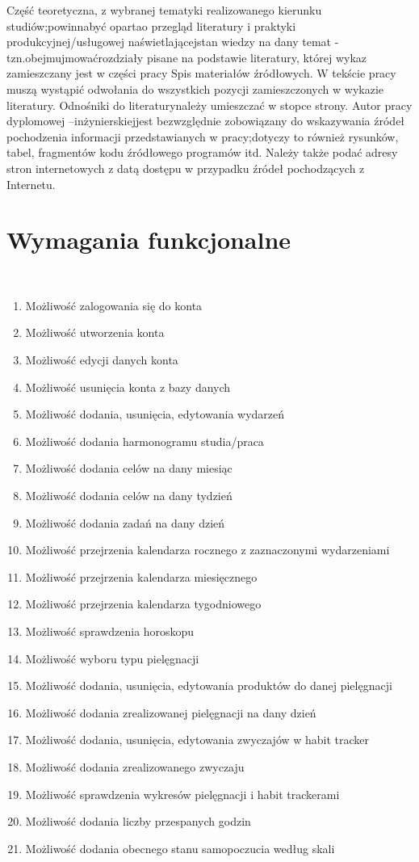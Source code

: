 Część teoretyczna, z wybranej tematyki realizowanego kierunku studiów;powinnabyć opartao przegląd literatury i praktyki produkcyjnej/usługowej naświetlającejstan wiedzy na dany temat -tzn.obejmujmowaćrozdziały pisane na podstawie literatury, której wykaz zamieszczany jest w części pracy Spis materiałów źródłowych. W tekście pracy muszą wystąpić odwołania do wszystkich pozycji zamieszczonych w wykazie literatury. Odnośniki do literaturynależy umieszczać w stopce strony. Autor pracy dyplomowej –inżynierskiejjest bezwzględnie zobowiązany do wskazywania źródeł pochodzenia informacji przedstawianych w pracy;dotyczy to również rysunków, tabel, fragmentów kodu źródłowego programów itd. Należy także podać adresy stron internetowych z datą dostępu w przypadku źródeł pochodzących z Internetu.

\phantom{Th} 

\section{Wymagania funkcjonalne}\\
\begin{enumerate}
  \item Możliwość zalogowania się do konta
  \item Możliwość utworzenia konta
  \item Możliwość edycji danych konta
  \item Możliwość usunięcia konta z bazy danych
  \item Możliwość dodania, usunięcia, edytowania wydarzeń 
  \item Możliwość dodania harmonogramu studia/praca
  \item Możliwość dodania celów na dany miesiąc
  \item Możliwość dodania celów na dany tydzień
  \item Możliwość dodania zadań na dany dzień 
  \item Możliwość przejrzenia kalendarza rocznego z zaznaczonymi wydarzeniami
  \item Możliwość przejrzenia kalendarza miesięcznego
  \item Możliwość przejrzenia kalendarza tygodniowego
  \item Możliwość sprawdzenia horoskopu
  \item Możliwość wyboru typu pielęgnacji
  \item Możliwość dodania, usunięcia, edytowania produktów do danej pielęgnacji
  \item Możliwość dodania zrealizowanej pielęgnacji na dany dzień 
  \item Możliwość dodania, usunięcia, edytowania zwyczajów w habit tracker
  \item Możliwość dodania zrealizowanego zwyczaju 
  \item Możliwość sprawdzenia wykresów pielęgnacji i habit trackerami 
  \item Możliwość dodania liczby przespanych godzin
  \item Możliwość dodania obecnego stanu samopoczucia według skali 
\end{enumerate}

